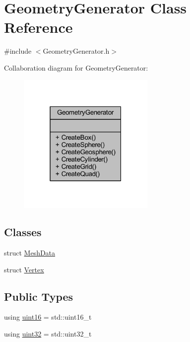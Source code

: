 \hypertarget{class_geometry_generator}{}\section{Geometry\+Generator Class Reference}
\label{class_geometry_generator}


{\ttfamily \#include $<$Geometry\+Generator.\+h$>$}



Collaboration diagram for Geometry\+Generator\+:\nopagebreak
\begin{figure}[H]
\begin{center}
\leavevmode
\includegraphics[width=187pt]{class_geometry_generator__coll__graph}
\end{center}
\end{figure}
\subsection*{Classes}
\begin{DoxyCompactItemize}
\item 
struct \hyperlink{struct_geometry_generator_1_1_mesh_data}{Mesh\+Data}
\item 
struct \hyperlink{struct_geometry_generator_1_1_vertex}{Vertex}
\end{DoxyCompactItemize}
\subsection*{Public Types}
\begin{DoxyCompactItemize}
\item 
using \hyperlink{class_geometry_generator_a2b566f68436d7cca7976e6d7e3bae53d_a2b566f68436d7cca7976e6d7e3bae53d}{uint16} = std\+::uint16\+\_\+t
\item 
using \hyperlink{class_geometry_generator_a37fc6dd464913f90a718f59862a9beeb_a37fc6dd464913f90a718f59862a9beeb}{uint32} = std\+::uint32\+\_\+t
\end{DoxyCompactItemize}
